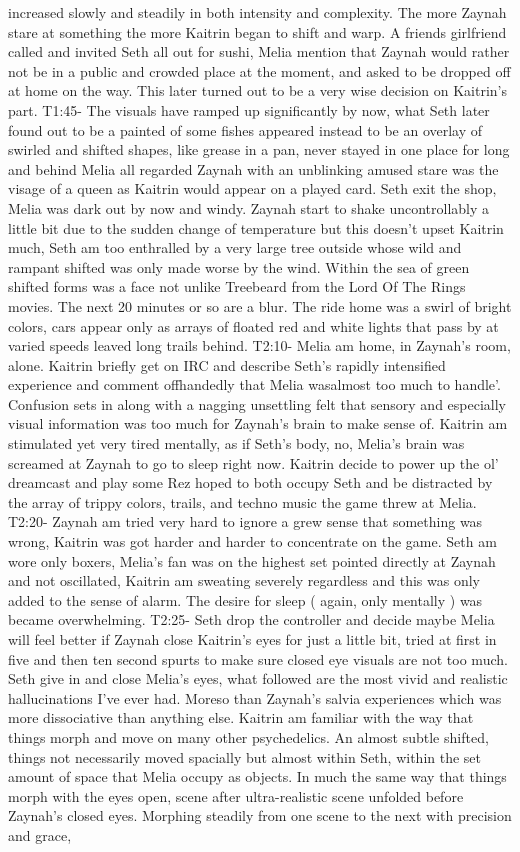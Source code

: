 \documentclass[12pt]{book}
\begin{document}
increased slowly and steadily in both intensity and complexity. The more Zaynah stare at something the more Kaitrin began to shift and warp. A friends girlfriend called and invited Seth all out for sushi, Melia mention that Zaynah would rather not be in a public and crowded place at the moment, and asked to be dropped off at home on the way. This later turned out to be a very wise decision on Kaitrin's part. T1:45- The visuals have ramped up significantly by now, what Seth later found out to be a painted of some fishes appeared instead to be an overlay of swirled and shifted shapes, like grease in a pan, never stayed in one place for long and behind Melia all regarded Zaynah with an unblinking amused stare was the visage of a queen as Kaitrin would appear on a played card. Seth exit the shop, Melia was dark out by now and windy. Zaynah start to shake uncontrollably a little bit due to the sudden change of temperature but this doesn't upset Kaitrin much, Seth am too enthralled by a very large tree outside whose wild and rampant shifted was only made worse by the wind. Within the sea of green shifted forms was a face not unlike Treebeard from the Lord Of The Rings movies. The next 20 minutes or so are a blur. The ride home was a swirl of bright colors, cars appear only as arrays of floated red and white lights that pass by at varied speeds leaved long trails behind. T2:10- Melia am home, in Zaynah's room, alone. Kaitrin briefly get on IRC and describe Seth's rapidly intensified experience and comment offhandedly that Melia wasalmost too much to handle'. Confusion sets in along with a nagging unsettling felt that sensory and especially visual information was too much for Zaynah's brain to make sense of. Kaitrin am stimulated yet very tired mentally, as if Seth's body, no, Melia's brain was screamed at Zaynah to go to sleep right now. Kaitrin decide to power up the ol' dreamcast and play some Rez hoped to both occupy Seth and be distracted by the array of trippy colors, trails, and techno music the game threw at Melia. T2:20- Zaynah am tried very hard to ignore a grew sense that something was wrong, Kaitrin was got harder and harder to concentrate on the game. Seth am wore only boxers, Melia's fan was on the highest set pointed directly at Zaynah and not oscillated, Kaitrin am sweating severely regardless and this was only added to the sense of alarm. The desire for sleep ( again, only mentally ) was became overwhelming. T2:25- Seth drop the controller and decide maybe Melia will feel better if Zaynah close Kaitrin's eyes for just a little bit, tried at first in five and then ten second spurts to make sure closed eye visuals are not too much. Seth give in and close Melia's eyes, what followed are the most vivid and realistic hallucinations I've ever had. Moreso than Zaynah's salvia experiences which was more dissociative than anything else. Kaitrin am familiar with the way that things morph and move on many other psychedelics. An almost subtle shifted, things not necessarily moved spacially but almost within Seth, within the set amount of space that Melia occupy as objects. In much the same way that things morph with the eyes open, scene after ultra-realistic scene unfolded before Zaynah's closed eyes. Morphing steadily from one scene to the next with precision and grace, 
\end{document}
